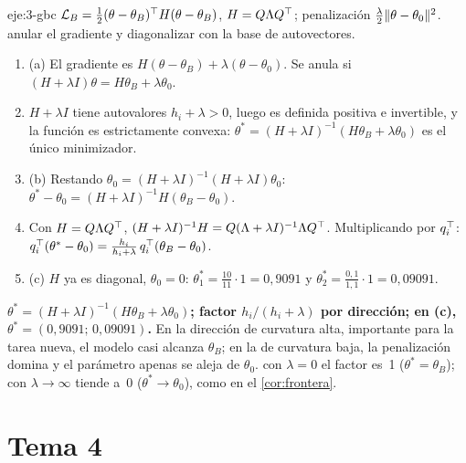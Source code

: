 \begin{solucion}{eje:3-gbc}
\datos $\mathcal{L}_B=\frac12(\theta-\theta_B)^{\top} H(\theta-\theta_B)$, $H=Q\Lambda Q^{\top}$; penalización $\frac{\lambda}{2}\lVert\theta-\theta_0\rVert^{2}$.
\planteamiento anular el gradiente y diagonalizar con la base de autovectores.
\pasos
\begin{enumerate}[label=\arabic*.]
  \item (a) El gradiente es $H(\theta-\theta_B)+\lambda(\theta-\theta_0)$. Se anula si $(H+\lambda I)\theta=H\theta_B+\lambda\theta_0$.
  \item $H+\lambda I$ tiene autovalores $h_i+\lambda>0$, luego es definida positiva e invertible, y la función es estrictamente convexa: $\theta^{\ast}=(H+\lambda I)^{-1}(H\theta_B+\lambda\theta_0)$ es el único minimizador.
  \item (b) Restando $\theta_0=(H+\lambda I)^{-1}(H+\lambda I)\theta_0$: $\theta^{\ast}-\theta_0=(H+\lambda I)^{-1}H(\theta_B-\theta_0)$.
  \item Con $H=Q\Lambda Q^{\top}$, $(H+\lambda I)^{-1}H=Q(\Lambda+\lambda I)^{-1}\Lambda Q^{\top}$. Multiplicando por $q_i^{\top}$: $q_i^{\top}(\theta^{\ast}-\theta_0)=\frac{h_i}{h_i+\lambda}\,q_i^{\top}(\theta_B-\theta_0)$.
  \item (c) $H$ ya es diagonal, $\theta_0=0$: $\theta^{\ast}_1=\frac{10}{11}\cdot 1=0{,}9091$ y $\theta^{\ast}_2=\frac{0{,}1}{1{,}1}\cdot 1=0{,}09091$.
\end{enumerate}
\resultado \textbf{$\theta^{\ast}=(H+\lambda I)^{-1}(H\theta_B+\lambda\theta_0)$; factor $h_i/(h_i+\lambda)$ por dirección; en (c), $\theta^{\ast}=(0{,}9091;\,0{,}09091)$.} En la dirección de curvatura alta, importante para la tarea nueva, el modelo casi alcanza $\theta_B$; en la de curvatura baja, la penalización domina y el parámetro apenas se aleja de $\theta_0$.
\comprobacion con $\lambda=0$ el factor es~1 ($\theta^{\ast}=\theta_B$); con $\lambda\to\infty$ tiende a~0 ($\theta^{\ast}\to\theta_0$), como en el \cref{cor:frontera}.
\end{solucion}

\section{Tema 4}

